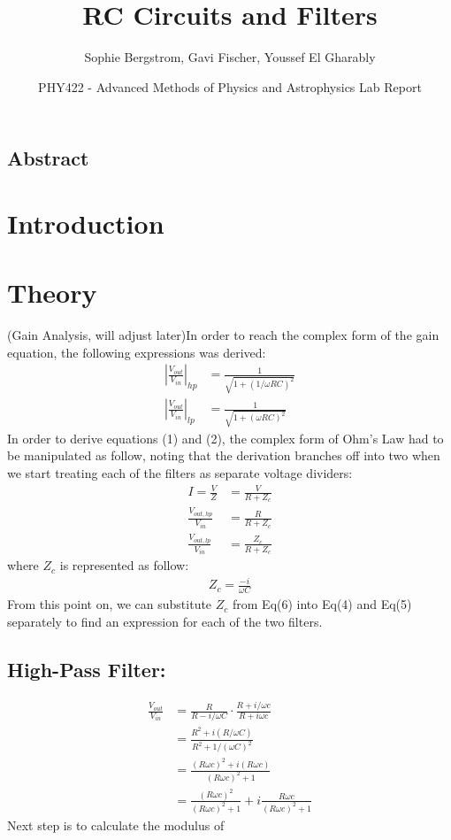 \documentclass[14pt]{article}
\title{\fontsize{32}{36}\selectfont RC Circuits and Filters}
\author{\fontsize{16}{20}\selectfont Sophie Bergstrom, Gavi Fischer, Youssef El Gharably}
\date{PHY422 - Advanced Methods of Physics and Astrophysics Lab Report}
\begin{document}
\maketitle
\justifying
\begin{center}
	\section*{Abstract}
\end{center}

\begin{multicols}{2}
	\section{Introduction}
	
	\section{Theory}
	(Gain Analysis, will adjust later)\newline In order to reach the complex form of the gain equation, the following expressions was derived:
	\begin{align}
		\left| \frac{V_{out}}{V_{in}} \right|_{hp} &= \frac{1}{\sqrt{1+(1/\omega RC)^2}} \\
		\left| \frac{V_{out}}{V_{in}} \right|_{lp} &= \frac{1}{\sqrt{1+(\omega RC)^2}}
	\end{align}
	In order to derive equations (1) and (2), the complex form of Ohm's Law had to be manipulated as follow, noting that the derivation branches off into two when we start treating each of the filters as separate voltage dividers:
	\begin{align}
		I = \frac{V}{Z} &= \frac{V}{R+Z_c} \\
		\frac{V_{out,hp}}{V_{in}} &= \frac{R}{R + Z_c} \\
		\frac{V_{out,lp}}{V_{in}} &= \frac{Z_c}{R+Z_c}
	\end{align}
	\indent where $Z_c$ is represented as follow:
	\begin{gather}
		Z_c = \frac{-i}{\omega C}
	\end{gather}
	From this point on, we can substitute $Z_c$ from Eq(6) into Eq(4) and Eq(5) separately to find an expression for each of the two filters.
	\subsection{High-Pass Filter:}
	\begin{align}
		\frac{V_{out}}{V_{in}} &= \frac{R}{R-i/\omega C}\cdot \frac{R+i/\omega c}{R+i\omega c} \\
		&= \frac{R^2 + i (R/\omega C)}{R^2 + 1/(\omega C)^2} \\
		&= \frac{(R\omega c)^2 + i(R\omega c)}{(R\omega c)^2 + 1} \\
		&= \frac{(R\omega c)^2}{(R\omega c)^2 + 1} + i\frac{R\omega c}{(R\omega c)^2+1}
	\end{align}
	Next step is to calculate the modulus of 
	

\end{multicols}
\end{document}
